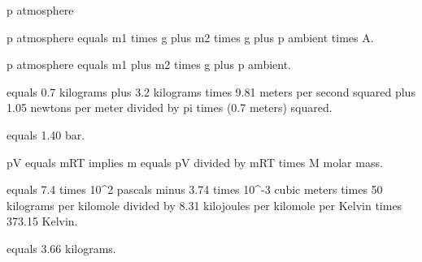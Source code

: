 p atmosphere

p atmosphere equals m1 times g plus m2 times g plus p ambient times A.

p atmosphere equals m1 plus m2 times g plus p ambient.

equals 0.7 kilograms plus 3.2 kilograms times 9.81 meters per second squared plus 1.05 newtons per meter divided by pi times (0.7 meters) squared.

equals 1.40 bar.

pV equals mRT implies m equals pV divided by mRT times M molar mass.

equals 7.4 times 10^2 pascals minus 3.74 times 10^-3 cubic meters times 50 kilograms per kilomole divided by 8.31 kilojoules per kilomole per Kelvin times 373.15 Kelvin.

equals 3.66 kilograms.